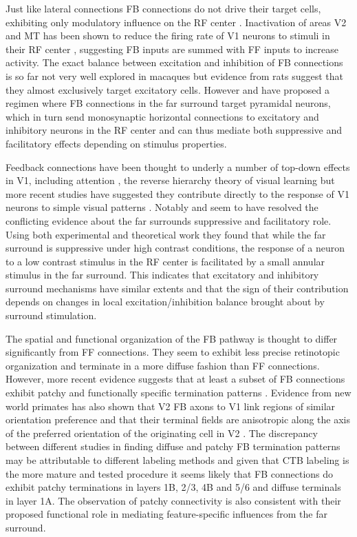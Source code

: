 Just like lateral connections FB connections do not drive their target
cells, exhibiting only modulatory influence on the RF center
\citep{Bullier2001a}. Inactivation of areas V2 and MT has been shown
to reduce the firing rate of V1 neurons to stimuli in their RF center
\citep{Hupe1998}, suggesting FB inputs are summed with FF inputs to
increase activity. The exact balance between excitation and inhibition
of FB connections is so far not very well explored in macaques but
evidence from rats suggest that they almost exclusively target
excitatory cells. However \cite{Angelucci2006} and \cite{Schwabe2006}
have proposed a regimen where FB connections in the far surround
target pyramidal neurons, which in turn send monosynaptic horizontal
connections to excitatory and inhibitory neurons in the RF center and
can thus mediate both suppressive and facilitatory effects depending
on stimulus properties.

Feedback connections have been thought to underly a number of top-down
effects in V1, including attention \citep{Treue2003}, the reverse
hierarchy theory of visual learning \citep{Ahissar2004} but more
recent studies have suggested they contribute directly to the response
of V1 neurons to simple visual patterns
\citep{Angelucci2002,Angelucci2003,Schwabe2006}. Notably
\cite{Schwabe2006} and \cite{Ichida2007} seem to have resolved the
conflicting evidence about the far surrounds suppressive and
facilitatory role. Using both experimental and theoretical work they
found that while the far surround is suppressive under high contrast
conditions, the response of a neuron to a low contrast stimulus in the
RF center is facilitated by a small annular stimulus in the far
surround. This indicates that excitatory and inhibitory surround
mechanisms have similar extents and that the sign of their
contribution depends on changes in local excitation/inhibition balance
brought about by surround stimulation.

The spatial and functional organization of the FB pathway is thought
to differ significantly from FF connections. They seem to exhibit less
precise retinotopic organization and terminate in a more diffuse
fashion than FF connections. However, more recent evidence suggests
that at least a subset of FB connections exhibit patchy and
functionally specific termination patterns
\citep{Angelucci2006}. Evidence from new world primates has also shown
that V2 FB axons to V1 link regions of similar orientation preference
and that their terminal fields are anisotropic along the axis of the
preferred orientation of the originating cell in V2
\citep{Shmuel2005}. The discrepancy between different studies in
finding diffuse and patchy FB termination patterns may be attributable
to different labeling methods and given that CTB labeling is the more
mature and tested procedure it seems likely that FB connections do
exhibit patchy terminations in layers 1B, 2/3, 4B and 5/6 and diffuse
terminals in layer 1A. The observation of patchy connectivity is also
consistent with their proposed functional role in mediating
feature-specific influences from the far surround.

